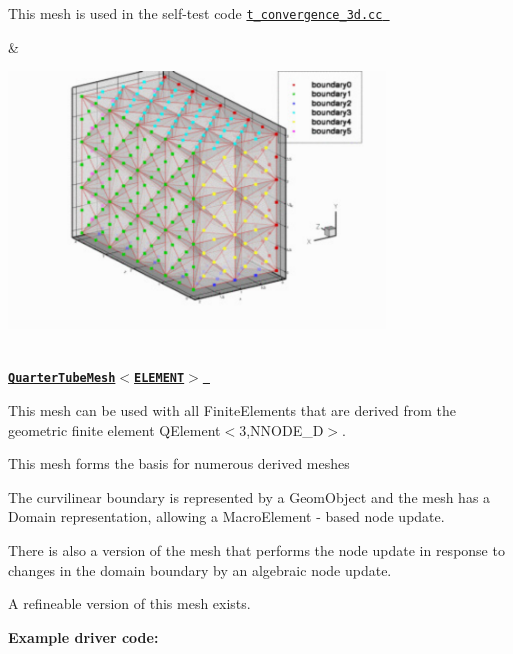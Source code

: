 \begin{center}
\begin{longtabu}
\begin{DoxyItemize}
\item This mesh is used in the self-\/test code \href{../../../../self_test/poisson/convergence_tests/t_convergence_3d.cc}{\tt {\ttfamily t\+\_\+convergence\+\_\+3d.\+cc} }
\end{DoxyItemize}& 
\begin{DoxyImageNoCaption}
  \mbox{\includegraphics[width=0.75\textwidth]{simple_cubic_tetmesh}}
\end{DoxyImageNoCaption}
   \\
\href{classoomph_1_1QuarterTubeMesh.html}{\tt {\bfseries  Quarter\+Tube\+Mesh$<$\+E\+L\+E\+M\+E\+N\+T$>$ }} ~\newline
~\newline

\begin{DoxyItemize}
\item This mesh can be used with all {\ttfamily Finite\+Elements} that are derived from the geometric finite element {\ttfamily Q\+Element$<$3,\+N\+N\+O\+D\+E\+\_\+D$>$}.
\item This mesh forms the basis for numerous derived meshes
\item The curvilinear boundary is represented by a {\ttfamily Geom\+Object} and the mesh has a {\ttfamily Domain} representation, allowing a {\ttfamily Macro\+Element} -\/ based node update.
\item There is also a version of the mesh that performs the node update in response to changes in the domain boundary by an algebraic node update.
\item A refineable version of this mesh exists.
\end{DoxyItemize}{\bfseries Example driver code\+:} ~\newline


\end{longtabu}
\end{center}
